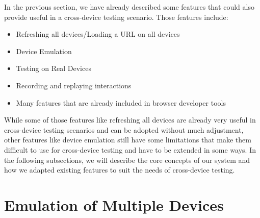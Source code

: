 In the previous section, we have already described some features that could also provide useful in a cross-device testing scenario. Those features include:
\begin{itemize}
	\item Refreshing all devices/Loading a URL on all devices
	\item Device Emulation
	\item Testing on Real Devices
	\item Recording and replaying interactions
	\item Many features that are already included in browser developer tools
\end{itemize}

While some of those features like refreshing all devices are already very useful in cross-device testing scenarios and can be adopted without much adjustment, other features like device emulation still have some limitations that make them difficult to use for cross-device testing and have to be extended in some ways. In the following subsections, we will describe the core concepts of our system and how we adapted existing features to suit the needs of cross-device testing.

\section{Emulation of Multiple Devices}

